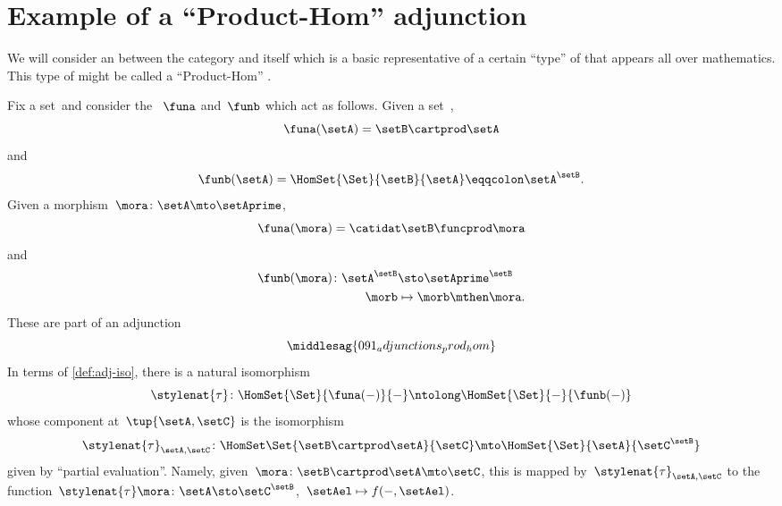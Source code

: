 
\section[Product-Hom adjunction]{Example of a ``Product-Hom'' adjunction}
We will consider an  between the category \Set and itself which is a basic representative of a certain ``type'' of  that appears all over mathematics.
This type of  might be called a ``Product-Hom'' .

Fix a set~\setB and consider the ~$\funa$ and~$\funb$ which act as follows.
Given a set~\setA,
\begin{equation}\label{eq:product-with-a-set-functor-objects}
    \funa(\setA) = \setB \cartprod \setA
\end{equation}
and
\begin{equation}\label{eq:set-expontiation-functor-objects}
    \funb(\setA) = \HomSet{\Set}{\setB}{\setA} \eqqcolon \setA^\setB.
\end{equation}
Given a morphism~$\mora\colon \setA \mto \setAprime$,
\begin{equation}\label{eq:product-with-a-set-functor-morphisms}
    \funa(\mora) = \catidat\setB \funcprod \mora
\end{equation}
and
\begin{equation}\label{eq:set-exponentiation-functor-morphisms}
    \begin{aligned}
        \funb(\mora)\colon \setA^\setB & \sto \setAprime^\setB \\
        \morb                          & \mapsto \morb \mthen \mora.
    \end{aligned}
\end{equation}
%
These  are part of an adjunction
%
\begin{equation}\label{eq:prod-hom-adjunction-diagram}
    \middlesag{091_adjunctions_prod_hom}
\end{equation}
In terms of \cref{def:adj-iso}, there is a natural isomorphism
\begin{equation}\label{eq:prod-hom-adjunction-transpose-nat-iso}
    \stylenat{\tau}\colon \HomSet{\Set}{\funa(- )}{-} \ntolong \HomSet{\Set}{-}{\funb( - )}
\end{equation}
whose component at~$\tup{\setA,\setC}$ is the isomorphism
\begin{equation}\label{eq:prod-hom-adjunction-transpose-components}
    \stylenat{\tau}_{\setA,\setC} \colon \HomSet\Set{\setB\cartprod \setA}{\setC} \mto \HomSet{\Set}{\setA}{\setC^\setB}
\end{equation}
given by ``partial evaluation''.
Namely, given~$\mora \colon \setB \cartprod \setA \mto \setC$, this is mapped by~$\stylenat{\tau}_{\setA,\setC}$ to the function~$\stylenat{\tau}\mora \colon \setA \sto \setC^\setB$,~$\setAel \mapsto f( -, \setAel)$.

